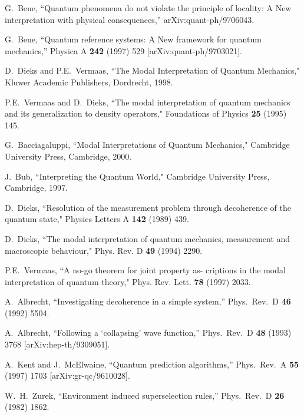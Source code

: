 \documentclass[12pt]{article}
\begin{document}
\begin{thebibliography}{99}
{%
  G.~Bene,
  ``Quantum phenomena do not violate the principle of locality: A New interpretation with physical consequences,''
  arXiv:quant-ph/9706043.

  G.~Bene,
  ``Quantum reference systems: A New framework for quantum mechanics,'' Physica A {\bf242} (1997) 529 [arXiv:quant-ph/9703021].
  
D.~Dieks and P.E.~Vermaas, ``The Modal Interpretation of Quantum Mechanics," Kluwer Academic Publishers, Dordrecht, 1998.

P.E.~Vermaas and D.~Dieks, ``The modal interpretation
of quantum mechanics and its generalization to density
operators," Foundations of Physics {\bf25} (1995) 145.

G.~Bacciagaluppi, ``Modal Interpretations of Quantum Mechanics," Cambridge University Press, Cambridge, 2000. 

J.~Bub, ``Interpreting the Quantum World," Cambridge
University Press, Cambridge, 1997.  
 
D.~Dieks, ``Resolution of the measurement problem
through decoherence of the quantum state," Physics Letters A {\bf142} (1989) 439.

D.~Dieks, ``The modal interpretation of quantum mechanics, measurement and macroscopic behaviour," Phys.
Rev. D {\bf49} (1994) 2290.

P.E.~Vermaas, ``A no-go theorem for joint property as-
criptions in the modal interpretation of quantum theory," Phys. Rev. Lett. {\bf78} (1997) 2033. 


  A.~Albrecht,
  ``Investigating decoherence in a simple system,''
  Phys.\ Rev.\ D {\bf 46} (1992) 5504.
  
  A.~Albrecht,
  ``Following a `collapsing' wave function,''
  Phys.\ Rev.\ D {\bf 48} (1993) 3768
  [arXiv:hep-th/9309051].
 
 
  A.~Kent and J.~McElwaine,
  ``Quantum prediction algorithms,''
  Phys.\ Rev.\ A {\bf 55} (1997) 1703
  [arXiv:gr-qc/9610028].
 
  
  W.~H.~Zurek,
  ``Environment induced superselection rules,''
  Phys.\ Rev.\ D {\bf 26} (1982) 1862.
 
}
\end{thebibliography}
\end{document}
